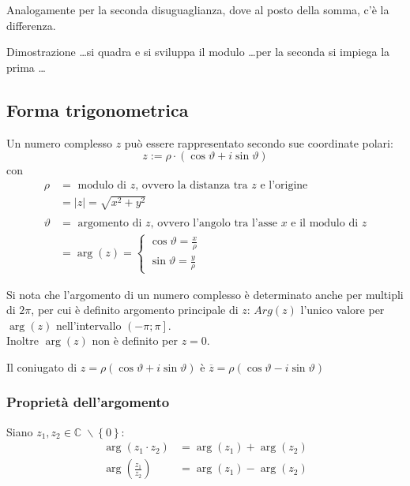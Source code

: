 \documentclass[a4paper]{article}
\begin{document}
Analogamente per la seconda disuguaglianza, dove al posto della somma, c'è la differenza.

Dimostrazione \dots si quadra e si sviluppa il modulo \dots per la seconda si impiega la prima \dots


\subsection{Forma trigonometrica}
Un numero complesso \(z\) può essere rappresentato secondo sue coordinate polari:
\[z := \rho \cdot \left( \cos \vartheta + i \sin \vartheta \right)\]
con
\begin{align*}
	\rho &= \text{ modulo di } z \text{, ovvero la distanza tra } z \text{ e l'origine} \\
	&= \left| z \right| = \sqrt{x^2 + y^2} \\
	\\
	\vartheta &= \text{ argomento di } z \text{, ovvero l'angolo tra l'asse } x \text{ e il modulo di } z\\
	&= \arg(z) = 
	\begin{cases}
		\cos \vartheta = \frac{x}{\rho} \\
		\sin \vartheta = \frac{y}{\rho}
	\end{cases}
\end{align*}

Si nota che l'argomento di un numero complesso è determinato anche per multipli di \(2 \pi\), per cui è definito argomento principale
di \(z\): \(Arg(z)\) l'unico valore per \(\arg(z)\) nell'intervallo \(\left( -\pi; \pi \right]\). \\
Inoltre \(\arg(z)\) non è definito per \(z = 0\).

Il coniugato di \(z = \rho \left( \cos \vartheta + i \sin \vartheta \right)\) è \(\overline{z} = \rho \left( \cos \vartheta - i \sin \vartheta \right)\)


\subsubsection*{Proprietà dell'argomento}
Siano \(z_1, z_2 \in \mathbb{C} \; \backslash \left\{ 0 \right\}\):
\begin{align*}
	\arg \left( z_1 \cdot z_2 \right) &= \arg(z_1) + \arg(z_2) \\
	\arg \left( \frac{z_1}{z_2} \right) &= \arg(z_1) - \arg(z_2)
\end{align*}
\end{document}
